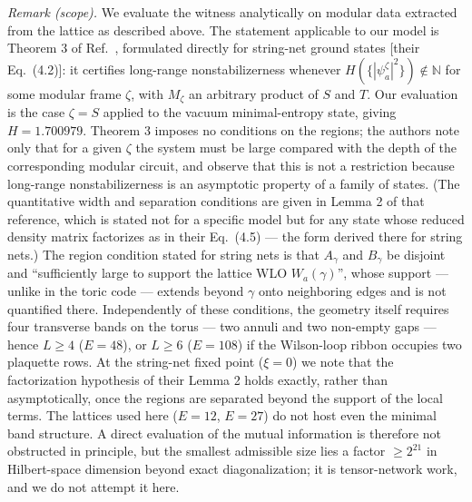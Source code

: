 \documentclass[aps,pra,twocolumn,superscriptaddress,longbibliography,floatfix,nofootinbib]{revtex4-2}
\begin{document}
\emph{Remark (scope).} We evaluate the witness analytically on modular
data extracted from the lattice as described above. The statement
applicable to our model is Theorem 3 of Ref.~\cite{Korbany2026},
formulated directly for string-net ground states [their Eq.~(4.2)]: it
certifies long-range nonstabilizerness whenever
$H(\{|\psi^\zeta_a|^2\})\notin\mathbb{N}$ for some modular frame
$\zeta$, with $M_\zeta$ an arbitrary product of $S$ and $T$. Our
evaluation is the case $\zeta=S$ applied to the vacuum minimal-entropy
state, giving $H=1.700979$. Theorem 3 imposes no conditions on the
regions; the authors note only that for a given $\zeta$ the system must
be large compared with the depth of the corresponding modular circuit,
and observe that this is not a restriction because long-range
nonstabilizerness is an asymptotic property of a family of states. (The
quantitative width and separation conditions are given in Lemma 2 of
that reference, which is stated not for a specific model but for any
state whose reduced density matrix factorizes as in their Eq.~(4.5) ---
the form derived there for string nets.) The region condition stated
for string nets is that $A_\gamma$ and $B_\gamma$ be disjoint and
``sufficiently large to support the lattice WLO $W_a(\gamma)$'', whose
support --- unlike in the toric code --- extends beyond $\gamma$ onto
neighboring edges and is not quantified there. Independently of these
conditions, the geometry itself requires four transverse bands on the
torus --- two annuli and two non-empty gaps --- hence $L\ge4$ ($E=48$),
or $L\ge6$ ($E=108$) if the Wilson-loop ribbon occupies two plaquette
rows. At the string-net fixed point ($\xi=0$) we note that the
factorization hypothesis of their Lemma 2 holds exactly, rather than
asymptotically, once the regions are separated beyond the support of
the local terms. The lattices used here ($E=12$, $E=27$) do not host
even the minimal band structure. A direct evaluation of the mutual
information is therefore not obstructed in principle, but the smallest
admissible size lies a factor $\ge2^{21}$ in Hilbert-space dimension
beyond exact diagonalization; it is tensor-network work, and we do not
attempt it here.
\end{document}
